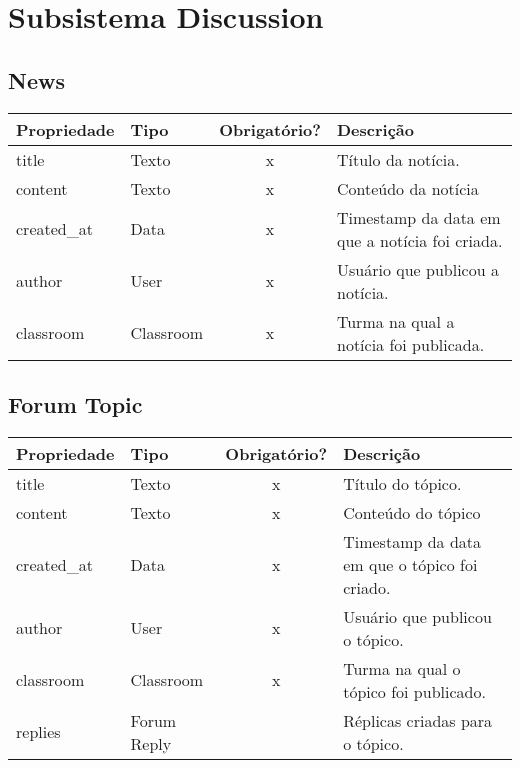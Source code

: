 \newpage

\section{Subsistema Discussion}
\subsection{News} \label{News}
\begin{table}[H]
	\footnotesize
	\begin{tabularx}{\textwidth}{|X|X|c|p{7.8cm}|}   \hline \rowcolor[rgb]{0.8,0.8,0.8}
		
		\textbf{Propriedade} & \textbf{Tipo} & \textbf{Obrigatório?} & \centerline{\textbf{Descrição}} \\\hline  	
		
		title & Texto & x & Título da notícia. \\\hline		
		content & Texto & x & Conteúdo da notícia \\\hline		
		created\_at & Data & x & Timestamp da data em que a notícia foi criada. \\\hline
		author & User & x & Usuário que publicou a notícia. \\\hline
		classroom & Classroom & x & Turma na qual a notícia foi publicada. \\\hline	
		
	\end{tabularx}	
\end{table}

\subsection{Forum Topic} \label{Forum Topic}
\begin{table}[H]
	\footnotesize
	\begin{tabularx}{\textwidth}{|X|X|c|p{7.8cm}|}   \hline \rowcolor[rgb]{0.8,0.8,0.8}
		
		\textbf{Propriedade} & \textbf{Tipo} & \textbf{Obrigatório?} & \centerline{\textbf{Descrição}} \\\hline  	
		
		title & Texto & x & Título do tópico. \\\hline		
		content & Texto & x & Conteúdo do tópico \\\hline		
		created\_at & Data & x & Timestamp da data em que o tópico foi criado. \\\hline	
		author & User & x & Usuário que publicou o tópico. \\\hline
		classroom & Classroom & x & Turma na qual o tópico foi publicado. \\\hline
		replies & Forum Reply & {} & Réplicas criadas para o tópico. \\\hline
		
	\end{tabularx}	
\end{table}

